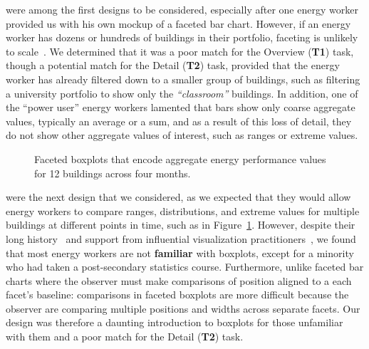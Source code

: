 \documentclass[journal]{vgtc}                %
\newcommand{\bqstart}[1]{\vspace{1mm} \noindent{\textbf{#1}}}
\begin{document}
\bqstart{Faceted bar charts} were among the first designs to be considered, especially after one energy worker provided us with his own mockup of a faceted bar chart.
However, if an energy worker has dozens or hundreds of buildings in their portfolio, faceting is unlikely to scale~\cite{Javed2010}. 
We determined that it was a poor match for the Overview ({\bf T1}) task, though a potential match for the Detail ({\bf T2}) task, provided that the energy worker has already filtered down to a smaller group of buildings, such as filtering a university portfolio to show only the {\it ``classroom''} buildings.
In addition, one of the ``power user'' energy workers lamented that bars show only coarse aggregate values, typically an average or a sum, and as a result of this loss of detail, they do not show other aggregate values of interest, such as ranges or extreme values.

\begin{figure}[ht]
	\centering
	\caption{Faceted boxplots that encode aggregate energy performance values for 12 buildings across four months.}
	\label{fig:sandbox-faceted-boxplot}
	\vspace{-0.3cm}
\end{figure} 

\bqstart{Faceted boxplots} were the next design that we considered, as we expected that they would allow energy workers to compare ranges, distributions, and extreme values for multiple buildings at different points in time, such as in Figure~\ref{fig:sandbox-faceted-boxplot}.
However, despite their long history~\cite{Wickham2011} and support from influential visualization practitioners~\cite{Few2014}, we found that most energy workers are not {\bf familiar} with boxplots, except for a minority who had taken a post-secondary statistics course.
Furthermore, unlike faceted bar charts where the observer must make comparisons of position aligned to a each facet's baseline: comparisons in faceted boxplots are more difficult because the observer are comparing multiple positions and widths across separate facets. 
Our design was therefore a daunting introduction to boxplots for those unfamiliar with them and a poor match for the Detail ({\bf T2}) task.
\end{document}
